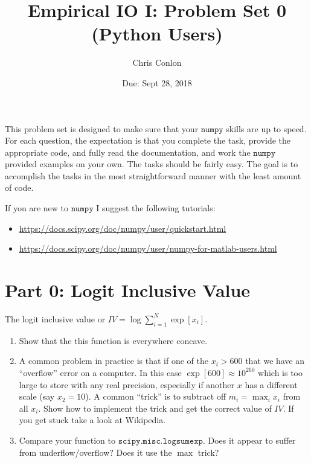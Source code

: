 \documentclass{article}
\begin{document}
\title{Empirical IO I: Problem Set 0 (Python Users)} 
\author{Chris Conlon}
\date{Due: Sept 28, 2018}
\maketitle
This problem set is designed to make sure that your $\mathtt{numpy}$ skills are up to speed. For each question, the expectation is that you complete the task, provide the appropriate code, and fully read the documentation, and work the $\mathtt{numpy}$ provided examples on your own.  The tasks should be fairly easy.  The goal is to accomplish the tasks in the most straightforward manner with the least amount of code.  

If you are new to $\mathtt{numpy}$ I suggest the following tutorials:
\begin{itemize}
\item \url{https://docs.scipy.org/doc/numpy/user/quickstart.html}
\item  \url{https://docs.scipy.org/doc/numpy/user/numpy-for-matlab-users.html}
\end{itemize}

\section*{Part 0: Logit Inclusive Value}
The logit inclusive value or $IV = \log \sum_{i=1}^N \exp[x_i]$.
\begin{enumerate}
\item Show that the this function is everywhere concave.
\item A common problem in practice is that if one of the $x_i > 600$ that we have an ``overflow'' error on a computer. In this case $\exp[600] \approx 10^{260}$ which is too large to store with any real precision, especially if another $x$ has a different scale (say $x_2=10$). A common ``trick'' is to subtract off $m_i = \max_i x_i$ from all $x_i$.  Show how to implement the trick and get the correct value of $IV$. If you get stuck take a look at Wikipedia.
\item Compare your function to $\mathtt{scipy.misc.logsumexp}$. Does it appear to suffer from underflow/overflow? Does it use the $\max$ trick?
\end{enumerate}
\end{document}
